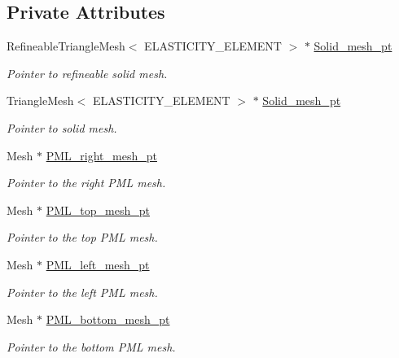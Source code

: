 \subsection*{Private Attributes}
\begin{DoxyCompactItemize}
\item 
Refineable\+Triangle\+Mesh$<$ E\+L\+A\+S\+T\+I\+C\+I\+T\+Y\+\_\+\+E\+L\+E\+M\+E\+NT $>$ $\ast$ \hyperlink{classElasticAnnulusProblem_a1e751b41cfaf6314fd93d8b79fbd6d0b}{Solid\+\_\+mesh\+\_\+pt}
\begin{DoxyCompactList}\small\item\em Pointer to refineable solid mesh. \end{DoxyCompactList}\item 
Triangle\+Mesh$<$ E\+L\+A\+S\+T\+I\+C\+I\+T\+Y\+\_\+\+E\+L\+E\+M\+E\+NT $>$ $\ast$ \hyperlink{classElasticAnnulusProblem_af1f36137c361d10c5a474ae186ecad3b}{Solid\+\_\+mesh\+\_\+pt}
\begin{DoxyCompactList}\small\item\em Pointer to solid mesh. \end{DoxyCompactList}\item 
Mesh $\ast$ \hyperlink{classElasticAnnulusProblem_aee24a0070e6010553756a66fd3e609b3}{P\+M\+L\+\_\+right\+\_\+mesh\+\_\+pt}
\begin{DoxyCompactList}\small\item\em Pointer to the right P\+ML mesh. \end{DoxyCompactList}\item 
Mesh $\ast$ \hyperlink{classElasticAnnulusProblem_a2dee4b212d38fb433c412ae6f1fb4c89}{P\+M\+L\+\_\+top\+\_\+mesh\+\_\+pt}
\begin{DoxyCompactList}\small\item\em Pointer to the top P\+ML mesh. \end{DoxyCompactList}\item 
Mesh $\ast$ \hyperlink{classElasticAnnulusProblem_a3498ed82cd25951598b22f3b61136556}{P\+M\+L\+\_\+left\+\_\+mesh\+\_\+pt}
\begin{DoxyCompactList}\small\item\em Pointer to the left P\+ML mesh. \end{DoxyCompactList}\item 
Mesh $\ast$ \hyperlink{classElasticAnnulusProblem_a3307dda934f6cb7bc0615db7eb5b717b}{P\+M\+L\+\_\+bottom\+\_\+mesh\+\_\+pt}
\begin{DoxyCompactList}\small\item\em Pointer to the bottom P\+ML mesh. \end{DoxyCompactList}\item 

\end{DoxyCompactItemize}

